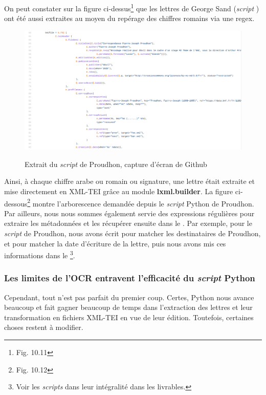 On peut constater sur la figure ci-dessus\footnote{Fig. 10.11} que les lettres de George Sand (\emph{script} ) ont été aussi extraites au moyen du repérage des chiffres romains via une regex.
\begin{figure}[ht]
    \centering
    \caption{Extrait du \emph{script} de Proudhon, capture d'écran de Github}
    \includegraphics[width=15cm]{images/scriptProudhon.png}
    \label{scriptProudhon}
\end{figure}

Ainsi, à chaque chiffre arabe ou romain ou signature, une lettre était extraite et mise directement en XML-TEI grâce au module \textbf{lxml.builder}. La figure ci-dessous\footnote{Fig. 10.12} montre l'arborescence demandée depuis le \emph{script} Python de Proudhon.\\

Par ailleurs, nous nous sommes également servie des expressions régulières pour extraire les métadonnées et les récupérer ensuite dans le . Par exemple, pour le \emph{script} de Proudhon, nous avons écrit  pour matcher les destinataires de Proudhon, et  pour matcher la date d'écriture de la lettre, puis nous avons mis ces informations dans le \footnote{Voir les \emph{scripts} dans leur intégralité dans les livrables.}. 

\subsubsection{Les limites de l'OCR entravent l'efficacité du \emph{script} Python}

Cependant, tout n'est pas parfait du premier coup. Certes, Python nous avance beaucoup et fait gagner beaucoup de temps dans l'extraction des lettres et leur transformation en fichiers XML-TEI en vue de leur édition. Toutefois, certaines choses restent à modifier.

